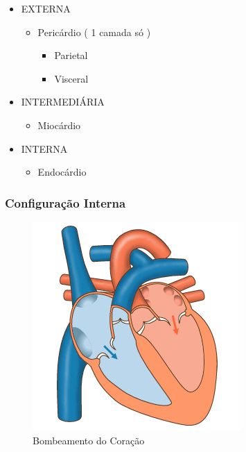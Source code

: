 \documentclass[
]{book}
\providecommand{\tightlist}{%
  \setlength{\itemsep}{0pt}\setlength{\parskip}{0pt}}
\begin{document}
\begin{itemize}
\tightlist
\item
  EXTERNA

  \begin{itemize}
  \tightlist
  \item
    Pericárdio ( 1 camada só )

    \begin{itemize}
    \tightlist
    \item
      Parietal
    \item
      Visceral
    \end{itemize}
  \end{itemize}
\item
  INTERMEDIÁRIA

  \begin{itemize}
  \tightlist
  \item
    Miocárdio
  \end{itemize}
\item
  INTERNA

  \begin{itemize}
  \tightlist
  \item
    Endocárdio
  \end{itemize}
\end{itemize}

\hypertarget{configurauxe7uxe3o-interna}{%
\subsubsection{Configuração Interna}\label{configurauxe7uxe3o-interna}}

\begin{figure}

{\centering \includegraphics[width=0.9\linewidth]{figuras/Aula7-2-bombeamento-coracao} 

}

\caption{Bombeamento do Coração}\label{fig:unnamed-chunk-15}
\end{figure}
\end{document}
